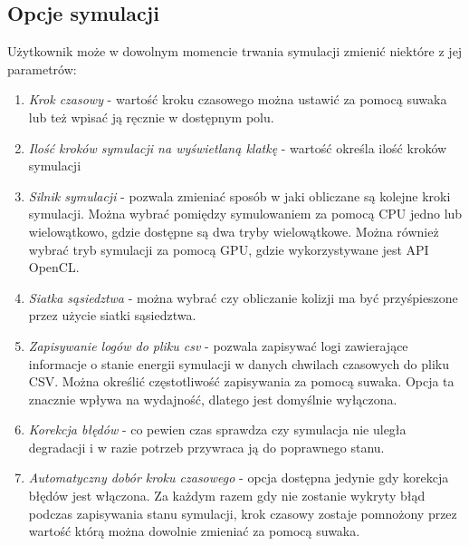 \documentclass[12pt, letterpaper]{report}
\begin{document}
    \subsection{Opcje symulacji}
    Użytkownik może w dowolnym momencie trwania symulacji zmienić niektóre z jej parametrów:
    \begin{enumerate}
        \item \emph{Krok czasowy} - wartość kroku czasowego można ustawić za pomocą suwaka lub też wpisać
        ją ręcznie w dostępnym polu.

        \item \emph{Ilość kroków symulacji na wyświetlaną klatkę} - wartość określa ilość kroków symulacji

        \item \emph{Silnik symulacji} - pozwala zmieniać sposób w jaki obliczane są kolejne kroki symulacji.
        Można wybrać pomiędzy symulowaniem za pomocą CPU jedno lub wielowątkowo, gdzie dostępne są dwa
        tryby wielowątkowe. Można również wybrać tryb symulacji za pomocą GPU, gdzie wykorzystywane jest API OpenCL.

        \item \emph{Siatka sąsiedztwa} - można wybrać czy obliczanie kolizji ma być przyśpieszone przez użycie
        siatki sąsiedztwa.

        \item \emph{Zapisywanie logów do pliku csv} - pozwala zapisywać logi zawierające informacje o stanie
        energii symulacji w danych chwilach czasowych do pliku CSV. Można określić częstotliwość zapisywania
        za pomocą suwaka. Opcja ta znacznie wpływa na wydajność, dlatego jest domyślnie wyłączona.

        \item \emph{Korekcja błędów} - co pewien czas sprawdza czy symulacja nie uległa degradacji i 
        w razie potrzeb przywraca ją do poprawnego stanu.

        \item \emph{Automatyczny dobór kroku czasowego} - opcja dostępna jedynie gdy korekcja błędów jest włączona.
        Za każdym razem gdy nie zostanie wykryty błąd podczas zapisywania stanu symulacji, krok czasowy zostaje
        pomnożony przez wartość którą można dowolnie zmieniać za pomocą suwaka.
        
    \end{enumerate}
\end{document}

